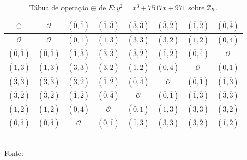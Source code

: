 \begin{table}[h!]\centering
	\caption{Tábua de operação $ \oplus$  de $E: y^2 = x^3 + 7517x + 971$ sobre $ \mathbb{Z}_{5} $.} \label{table:43b07651-6cce-4a77-8509-380502fd1f5a}
	\begin{tabular}{|c|c|c|c|c|c|c|c|}
		\hline
		$\oplus$                      & $\mathcal{O}$                 & $(\overline{0},\overline{1})$ & $(\overline{1},\overline{3})$ & $(\overline{3},\overline{3})$ & $(\overline{3},\overline{2})$ & $(\overline{1},\overline{2})$ & $(\overline{0},\overline{4})$ \\ \hline
		$\mathcal{O}$                 & $\mathcal{O}$                 & $(\overline{0},\overline{1})$ & $(\overline{1},\overline{3})$ & $(\overline{3},\overline{3})$ & $(\overline{3},\overline{2})$ & $(\overline{1},\overline{2})$ & $(\overline{0},\overline{4})$ \\ \hline
		$(\overline{0},\overline{1})$ & $(\overline{0},\overline{1})$ & $(\overline{1},\overline{3})$ & $(\overline{3},\overline{3})$ & $(\overline{3},\overline{2})$ & $(\overline{1},\overline{2})$ & $(\overline{0},\overline{4})$ & $\mathcal{O}$                 \\ \hline
		$(\overline{1},\overline{3})$ & $(\overline{1},\overline{3})$ & $(\overline{3},\overline{3})$ & $(\overline{3},\overline{2})$ & $(\overline{1},\overline{2})$ & $(\overline{0},\overline{4})$ & $\mathcal{O}$                 & $(\overline{0},\overline{1})$ \\ \hline
		$(\overline{3},\overline{3})$ & $(\overline{3},\overline{3})$ & $(\overline{3},\overline{2})$ & $(\overline{1},\overline{2})$ & $(\overline{0},\overline{4})$ & $\mathcal{O}$                 & $(\overline{0},\overline{1})$ & $(\overline{1},\overline{3})$ \\ \hline
		$(\overline{3},\overline{2})$ & $(\overline{3},\overline{2})$ & $(\overline{1},\overline{2})$ & $(\overline{0},\overline{4})$ & $\mathcal{O}$                 & $(\overline{0},\overline{1})$ & $(\overline{1},\overline{3})$ & $(\overline{3},\overline{3})$ \\ \hline
		$(\overline{1},\overline{2})$ & $(\overline{1},\overline{2})$ & $(\overline{0},\overline{4})$ & $\mathcal{O}$                 & $(\overline{0},\overline{1})$ & $(\overline{1},\overline{3})$ & $(\overline{3},\overline{3})$ & $(\overline{3},\overline{2})$ \\ \hline
		$(\overline{0},\overline{4})$ & $(\overline{0},\overline{4})$ & $\mathcal{O}$                 & $(\overline{0},\overline{1})$ & $(\overline{1},\overline{3})$ & $(\overline{3},\overline{3})$ & $(\overline{3},\overline{2})$ & $(\overline{1},\overline{2})$ \\ \hline
	\end{tabular}
	\vspace*{0.4cm}\\ %
	Fonte:  ----
\end{table}

